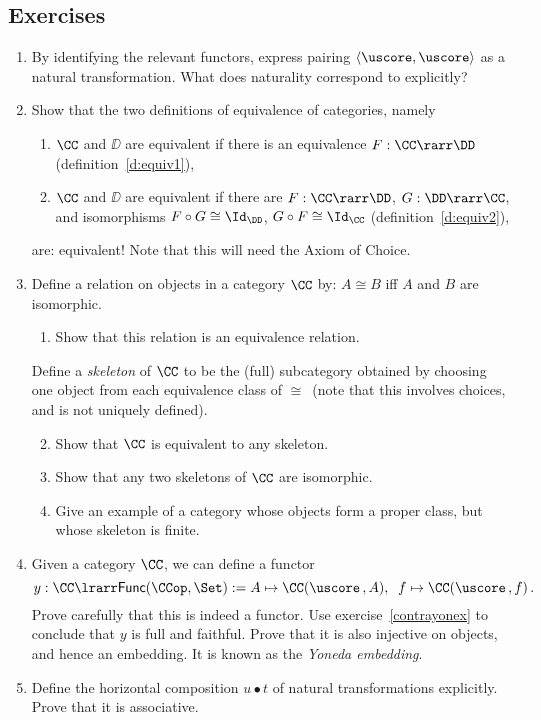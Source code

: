 \documentclass[12pt]{article}
\begin{document}
\subsection{Exercises}
\begin{enumerate}\renewcommand{\theenumi}{\textbf{\arabic{enumi}}}
\item By identifying the relevant functors, express pairing $\langle\uscore,\uscore\rangle$
 as a natural transformation. What does naturality correspond to explicitly?
  \item Show that the two definitions of equivalence of categories, namely
  \begin{enumerate}
    \item $\CC$ and $\DD$ are equivalent if there is an equivalence $F:\CC\rarr\DD$ (definition~\ref{d:equiv1}),
    \item $\CC$ and $\DD$ are equivalent if there are $F:\CC\rarr\DD$, $G:\DD\rarr\CC$, and isomorphisms $F\circ G\cong\Id_{\DD}$, $G\circ
    F\cong\Id_{\CC}$ (definition~\ref{d:equiv2}),
  \end{enumerate}
  are: equivalent!
  Note that this will need the Axiom of Choice.
  \item Define a relation on objects in a category $\CC$ by: $A \cong B$ iff $A$ and $B$ are isomorphic.
    \begin{enumerate}
      \item Show that this relation is an equivalence relation.
    \end{enumerate}
    Define a \emph{skeleton} of $\CC$ to be the (full) subcategory obtained by choosing one object from each equivalence class of $\cong$\, (note that
    this involves choices, and is not uniquely defined).
    \begin{enumerate}\setcounter{enumii}{1}
      \item Show that $\CC$ is equivalent to any skeleton.
      \item Show that any two skeletons of $\CC$ are isomorphic.
      \item Give an example of a category whose objects form a proper class, but whose skeleton is finite.
    \end{enumerate}

\item   Given a category $\CC$, we can define a functor
\[ y : \CC \lrarr \mathsf{Func}(\CCop, \Set) := A \mapsto \CC (\uscore\,,A), \;\; f \mapsto  \CC (\uscore\,,f) \, . \]
Prove carefully that this is indeed a functor. Use exercise~\ref{contrayonex} to  conclude that $y$ is full and faithful. Prove that it is also injective on objects, and hence an embedding. It is known as the \emph{Yoneda embedding}.

\item Define the horizontal composition $u \bullet t$ of natural transformations explicitly. Prove that it is associative.
\end{enumerate}
\end{document}
